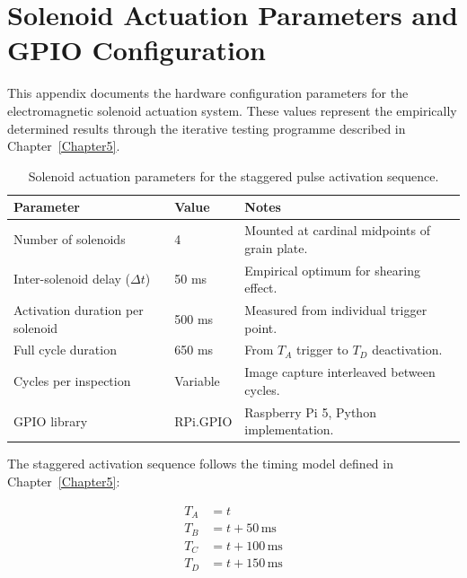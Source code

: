 
\chapter{Solenoid Actuation Parameters and GPIO Configuration}

\label{AppendixB}


This appendix documents the hardware configuration parameters for the electromagnetic solenoid actuation system. These values represent the empirically determined results through the iterative testing programme described in Chapter~\ref{Chapter5}.

\vspace{1em}

\begin{table}[h!]
\centering
\caption{Solenoid actuation parameters for the staggered pulse activation sequence.}
\label{tab:solenoid_params}
\begin{tabular}{p{5.5cm} p{3cm} p{5cm}}
\toprule
\textbf{Parameter} & \textbf{Value} & \textbf{Notes} \\
\midrule
Number of solenoids            & 4          & Mounted at cardinal midpoints of grain plate. \\
Inter-solenoid delay ($\Delta t$) & 50 ms   & Empirical optimum for shearing effect. \\
Activation duration per solenoid  & 500 ms  & Measured from individual trigger point. \\
Full cycle duration            & 650 ms     & From $T_A$ trigger to $T_D$ deactivation. \\
Cycles per inspection          & Variable   & Image capture interleaved between cycles. \\
GPIO library                   & RPi.GPIO   & Raspberry Pi 5, Python implementation. \\
\bottomrule
\end{tabular}
\end{table}

\vspace{1em}

\noindent The staggered activation sequence follows the timing model defined in Chapter~\ref{Chapter5}:

\begin{align}
    T_A &= t \nonumber \\
    T_B &= t + 50\,\text{ms} \nonumber \\
    T_C &= t + 100\,\text{ms} \nonumber \\
    T_D &= t + 150\,\text{ms} \nonumber
\end{align}


